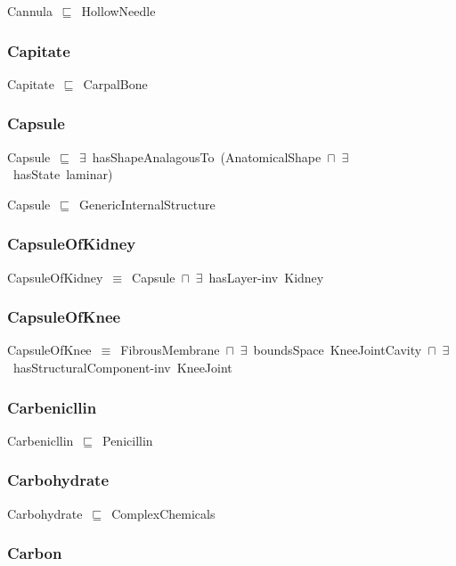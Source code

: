 \documentclass{article}
\begin{document}
Cannula~\ensuremath{\sqsubseteq}~HollowNeedle~

\subsubsection*{Capitate}

Capitate~\ensuremath{\sqsubseteq}~CarpalBone~

\subsubsection*{Capsule}

Capsule~\ensuremath{\sqsubseteq}~\ensuremath{\exists}~hasShapeAnalagousTo~(AnatomicalShape~\ensuremath{\sqcap}~\ensuremath{\exists}~hasState~laminar)~

Capsule~\ensuremath{\sqsubseteq}~GenericInternalStructure~

\subsubsection*{CapsuleOfKidney}

CapsuleOfKidney~\ensuremath{\equiv}~Capsule~\ensuremath{\sqcap}~\ensuremath{\exists}~hasLayer-inv~Kidney

\subsubsection*{CapsuleOfKnee}

CapsuleOfKnee~\ensuremath{\equiv}~FibrousMembrane~\ensuremath{\sqcap}~\ensuremath{\exists}~boundsSpace~KneeJointCavity~\ensuremath{\sqcap}~\ensuremath{\exists}~hasStructuralComponent-inv~KneeJoint

\subsubsection*{Carbenicllin}

Carbenicllin~\ensuremath{\sqsubseteq}~Penicillin~

\subsubsection*{Carbohydrate}

Carbohydrate~\ensuremath{\sqsubseteq}~ComplexChemicals~

\subsubsection*{Carbon}
\end{document}
